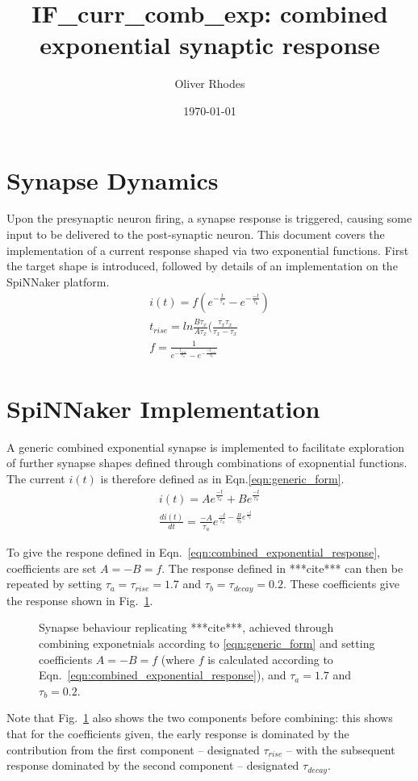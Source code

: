 \documentclass[12pt]{article}
\title{IF\_curr\_comb\_exp: combined exponential synaptic response}
\author{Oliver Rhodes}
\date{\today}
\begin{document}
\maketitle

\section{Synapse Dynamics}
Upon the presynaptic neuron firing, a synapse response is triggered, causing some input to be delivered to the post-synaptic neuron. This document covers the implementation of a current response shaped via two exponential functions. First the target shape is introduced, followed by details of an implementation on the SpiNNaker platform.
\begin{eqnarray}
i(t) = f(e^{-\frac{t}{\tau_a}} - e^{-\frac{-t}{\tau_b}}) \\
t_{rise} = ln\frac{B\tau_x}{A\tau_x}(\frac{\tau_x\tau_x}{\tau_x - \tau_x} \\
f = \frac{1}{e^{-\frac{t_{rise}}{\tau_a}} - e^{-\frac{-t_{rise}}{\tau_b}}}
\label{eqn:combined_exponential_response}
\end{eqnarray}

\section{SpiNNaker Implementation}
A generic combined exponential synapse is implemented to facilitate exploration of further synapse shapes defined through combinations of exopnential functions. The current $i(t)$ is therefore defined as in Eqn.\ref{eqn:generic_form}. 
\begin{eqnarray}
i(t) = Ae^{\frac{-t}{\tau_a}} + Be^{\frac{-t}{\tau_b}}\\
\frac{di(t)}{dt} = \frac{-A}{\tau_a}e^{\frac{-t}{\tau_a} - \frac{B}{\tau_b}e^{\frac{-t}{\tau_b}}}
\label{eqn:generic_form}
\end{eqnarray}

To give the respone defined in Eqn.~\ref{eqn:combined_exponential_response}, coefficients are set $A=-B=f$. The response defined in ***cite*** can then be repeated by setting $\tau_a = \tau_{rise} = 1.7$ and $\tau_b = \tau_{decay} = 0.2$. These coefficients give the response shown in Fig.~\ref{fig:typical_response}.
\begin{figure}
\caption{Synapse behaviour replicating ***cite***, achieved through combining exponetnials according to \ref{eqn:generic_form} and setting coefficients $A=-B=f$ (where $f$ is calculated according to Eqn.~\ref{eqn:combined_exponential_response}), and $\tau_a = 1.7$ and $\tau_b = 0.2$.}
\label{fig:typical_response}
\end{figure}
Note that Fig.~\ref{fig:typical_response} also shows the two components before combining: this shows that for the coefficients given, the early response is dominated by the contribution from the first component -- designated $\tau_{rise}$ -- with the subsequent response dominated by the second component -- designated $\tau_{decay}$.  
\end{document}
